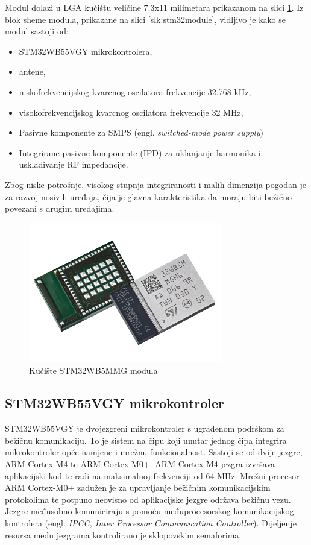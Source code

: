 \documentclass[../diplomski_rad.tex]{subfiles}
\begin{document}
Modul dolazi u LGA kućištu veličine 7.3x11 milimetara prikazanom na slici \ref{slk:stm32module_kuciste}. 
Iz blok sheme modula, prikazane na slici \ref{slk:stm32module}, 
vidljivo je kako se modul sastoji od:
\begin{itemize}
    \item STM32WB55VGY mikrokontrolera,
    \item antene,
    \item niskofrekvencijskog kvarcnog oscilatora frekvencije 32.768 kHz,
    \item visokofrekvencijskog kvarcnog oscilatora frekvencije 32 MHz,
    \item Pasivne komponente za SMPS (engl. \textit{switched-mode power supply}) 
    \item Integrirane pasivne komponente (IPD) za uklanjanje harmonika i usklađivanje RF impedancije.     
  \end{itemize} 
Zbog niske potrošnje, visokog stupnja integriranosti i malih dimenzija pogodan je za razvoj nosivih uređaja, 
čija je glavna karakteristika da moraju biti bežično povezani s drugim uređajima. 

\begin{figure}[htb]
    \centering
    \includegraphics[width=0.75\textwidth]{Figures/modul.png} 
    \caption{Kučište STM32WB5MMG modula \cite{modul_slika}}
    \label{slk:stm32module_kuciste}
\end{figure}

\subsection{STM32WB55VGY mikrokontroler}

STM32WB55VGY je dvojezgreni mikrokontroler s ugrađenom podrškom za bežičnu komunikaciju. 
To je sistem na čipu koji unutar jednog čipa integrira mikrokontroler opće namjene i mrežnu funkcionalnost. 
Sastoji se od dvije jezgre, ARM Cortex-M4 te ARM Cortex-M0+.  
ARM Cortex-M4 jezgra izvršava aplikacijski kod te radi na maksimalnoj frekvenciji od 64 MHz. 
Mrežni procesor ARM Cortex-M0+ zadužen je za upravljanje bežičnim komunikacijskim protokolima 
te potpuno neovisno od aplikacijske jezgre održava bežičnu vezu.
Jezgre međusobno komuniciraju s pomoću međuprocesorskog komunikacijskog kontrolera (engl. \textit{IPCC,  Inter Processor
Communication Controller}). 
Dijeljenje resursa među jezgrama kontrolirano je sklopovskim semaforima.
\end{document}
